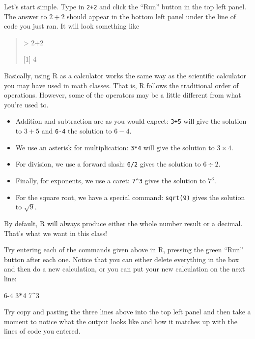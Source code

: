 \documentclass[
]{book}
\newenvironment{Shaded}{\begin{snugshade}}{\end{snugshade}}
\newcommand{\DecValTok}[1]{\textcolor[rgb]{0.00,0.00,0.81}{#1}}
\newcommand{\SpecialCharTok}[1]{\textcolor[rgb]{0.81,0.36,0.00}{\textbf{#1}}}
\providecommand{\tightlist}{%
  \setlength{\itemsep}{0pt}\setlength{\parskip}{0pt}}
\begin{document}
Let's start simple. Type in \texttt{2+2} and click the ``Run'' button in the top left panel. The answer to \(2+2\) should appear in the bottom left panel under the line of code you just ran. It will look something like

\begin{quote}
\textgreater{} 2+2

{[}1{]} 4
\end{quote}

Basically, using R as a calculator works the same way as the scientific calculator you may have used in math classes. That is, R follows the traditional order of operations. However, some of the operators may be a little different from what you're used to.

\begin{itemize}
\tightlist
\item
  Addition and subtraction are as you would expect: \texttt{3+5} will give the solution to \(3+5\) and \texttt{6-4} the solution to \(6-4\).
\item
  We use an asterisk for multiplication: \texttt{3*4} will give the solution to \(3\times 4\).
\item
  For division, we use a forward slash: \texttt{6/2} gives the solution to \(6 \div 2\).
\item
  Finally, for exponents, we use a caret: \texttt{7\^{}3} gives the solution to \(7^3\).
\item
  For the square root, we have a special command: \texttt{sqrt(9)} gives the solution to \(\sqrt{9}\).
\end{itemize}

By default, R will always produce either the whole number result or a decimal. That's what we want in this class!

Try entering each of the commands given above in R, pressing the green ``Run'' button after each one. Notice that you can either delete everything in the box and then do a new calculation, or you can put your new calculation on the next line:

\begin{Shaded}
\begin{Highlighting}[]
\DecValTok{6{-}4}
\DecValTok{3}\SpecialCharTok{*}\DecValTok{4}
\DecValTok{7}\SpecialCharTok{\^{}}\DecValTok{3}
\end{Highlighting}
\end{Shaded}

Try copy and pasting the three lines above into the top left panel and then take a moment to notice what the output looks like and how it matches up with the lines of code you entered.
\end{document}
